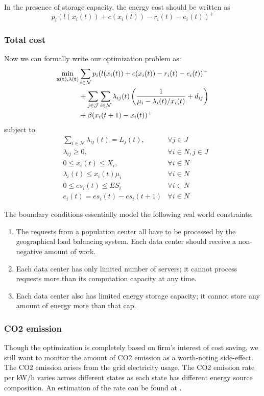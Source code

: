 \documentclass{acm_proc_article-sp}
\begin{document}
In the presence of storage capacity, the energy cost should be written as 
\begin{equation}
p_i(l(x_i(t)) + c(x_i(t)) - r_i(t) - e_i(t))^+
\end{equation} 

\subsubsection{Total cost}
Now we can formally write our optimization problem as:
\begin{align*}
\min_{\bf{x}(t), \bf{\lambda}(t)} & \sum_{i \in \mathcal{N}} p_i(l(x_i(t)) + c(x_i(t)) - r_i(t) - e_i(t))^+ \\
& + \sum_{j \in \mathcal{J}}\sum_{i \in \mathcal{N}}
\lambda_{ij}(t)\left(\frac{1}{\mu_i - \lambda_i(t)/x_i(t)} + d_{ij}\right) \\
& + \beta(x_i(t+1) - x_i(t))^+
\end{align*}
subject to
\begin{align*}
& \sum_{i\in \mathcal{N}}\lambda_{ij}(t) = L_j(t), &\forall j\in J  \\
& \lambda_{ij} \geq 0, & \forall i\in N, j\in J  \\
& 0 \leq x_i(t) \leq X_i, & \forall i \in N  \\
& \lambda_i(t) \leq x_i(t)\mu_i & \forall i \in N \\
& 0 \leq es_i(t) \leq ES_i & \forall i \in N \\
& e_i(t) = es_i(t) - es_i(t+1) & \forall i \in N
\end{align*}

The boundary conditions essentially model the following real world constraints:
\begin{enumerate}
\item
The requests from a population center all have to be processed by the geographical load balancing system. Each data center should receive a non-negative amount of work.
\item
Each data center has only limited number of servers; it cannot process requests more than its computation capacity at any time.
\item
Each data center also has limited energy storage capacity; it cannot store any amount of energy more than that cap.
\end{enumerate}
\subsubsection{CO2 emission}
Though the optimization is completely based on firm's interest of cost saving, we still want to monitor the amount of CO2 emission as a worth-noting side-effect. The CO2 emission arises from the grid electricity usage. The CO2 emission rate per kW/h varies across different states as each state has different energy source composition. An estimation of the rate can be found at \cite{carbon}.
\end{document}
